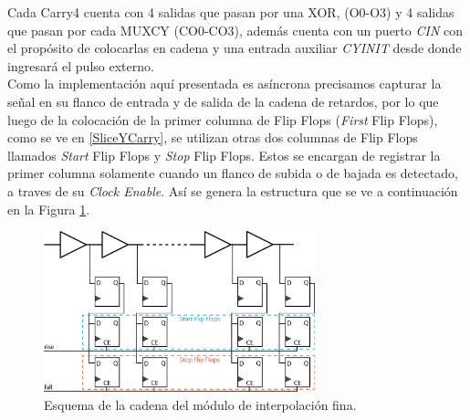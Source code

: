 Cada Carry4 cuenta con 4 salidas que pasan por una XOR, (O0-O3) y 4 salidas que pasan por
cada MUXCY (CO0-CO3), además cuenta con un puerto \textit{CIN} con el propósito de colocarlas
en cadena y una entrada auxiliar \textit{CYINIT} desde donde ingresará el pulso externo.\\
Como la implementación aquí presentada es asíncrona precisamos capturar la señal en su flanco de entrada y de
salida de la cadena de retardos, por lo que luego de la colocación de la primer columna de Flip Flops (\textit{First} Flip Flops), 
como se ve en \ref{SliceYCarry}, se utilizan otras dos columnas de Flip Flops llamados \textit{Start} Flip Flops y \textit{Stop} 
Flip Flops. Estos se encargan de registrar la primer columna solamente cuando un flanco de subida o de bajada es detectado,
a traves de su \textit{Clock Enable}. Así se genera la estructura que se ve a continuación en la Figura \ref{fig: fine}.

\begin{figure}[H]
     \centering
     \includegraphics[width=0.7\textwidth]{imagenes/fine.eps}
     \caption{Esquema de la cadena del módulo de interpolación fina.}
     \label{fig: fine}
\end{figure}

